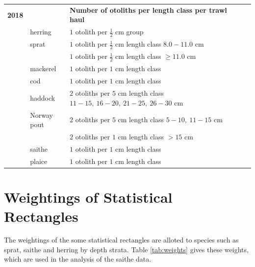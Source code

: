 \documentclass[a4paper 12pt]{article}
\numberwithin{equation}{section}
\begin{document}
\begin{small}
\begin{table}[h!]
\begin{tabularx}{\linewidth}{r l l l l X}
{\bf 2018} & & {\bf Number of otoliths per length class per trawl haul}  \\[1.0ex]
  & herring  &  $1$  otolith per $\frac{1}{2}$ cm group \\[0.5ex]
     & sprat    & $1$  otolith per $\frac{1}{2}$ cm length class  $8.0 -11.0$ cm\\[0.5ex]
              & & $1$  otolith per $\frac{1}{2}$ cm length class  $\geq 11.0$ cm\\[0.5ex]
& mackerel      & $1$  otolith per $1$ cm length class \\[0.5ex]
& cod       	  & $1$  otolith per $1$ cm length class\\[0.5ex]
& haddock & $2$  otoliths per $5$ cm length class $11 -15, \ 16-20, \ 21-25, \ 26-30$ cm \\[0.5ex]
& Norway pout & $2$  otoliths per $5$ cm length class $5 -10, \ 11-15$ cm\\[0.5ex]
               & & $2$  otoliths per $1$ cm length class $> 15$ cm\\[1.0ex]
&saithe        & $1$  otolith per $1$ cm length class \\[0.5ex]  
&plaice       & $1$  otolith per $1$ cm length class \\[0.1ex]
\bottomrule         
\end{tabularx}
\end{table}
\end{small}

 \section{\large Weightings of Statistical Rectangles}
 \label{secAp:weightings}
 
 The weightings of the some statistical rectangles are alloted to species such as sprat, saithe and herring by depth strata. Table \ref{tab:weights} gives these weights, which are used in the analysis of the saithe data.\\
 
\end{document}
